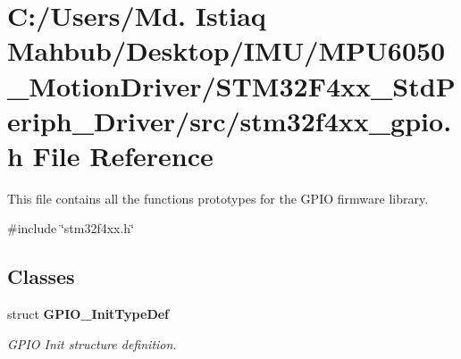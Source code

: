 \section{C\+:/\+Users/\+Md. Istiaq Mahbub/\+Desktop/\+I\+M\+U/\+M\+P\+U6050\+\_\+\+Motion\+Driver/\+S\+T\+M32\+F4xx\+\_\+\+Std\+Periph\+\_\+\+Driver/src/stm32f4xx\+\_\+gpio.h File Reference}
\label{stm32f4xx__gpio_8h}


This file contains all the functions prototypes for the G\+P\+IO firmware library.  


{\ttfamily \#include \char`\"{}stm32f4xx.\+h\char`\"{}}\newline
\subsection*{Classes}
\begin{DoxyCompactItemize}
\item 
struct \textbf{ G\+P\+I\+O\+\_\+\+Init\+Type\+Def}
\begin{DoxyCompactList}\small\item\em G\+P\+IO Init structure definition. \end{DoxyCompactList}\end{DoxyCompactItemize}
